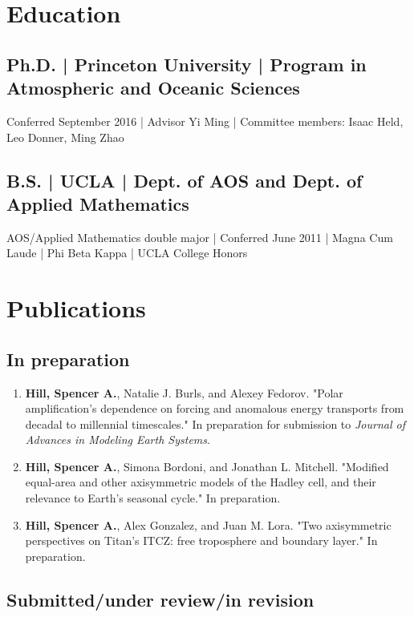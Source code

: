 \documentclass[12pt,letterpaper]{shillcv}
\begin{document}
\section*{Education}
\label{sec:orgf2144e1}
\subsection*{Ph.D. | Princeton University | Program in Atmospheric and Oceanic Sciences}
\label{sec:org8f08de2}
Conferred September 2016 | Advisor Yi Ming | Committee members: Isaac
Held, Leo Donner, Ming Zhao
\subsection*{B.S. | UCLA | Dept. of AOS and Dept. of Applied Mathematics}
\label{sec:orgc626792}
AOS/Applied Mathematics double major | Conferred June 2011 |
Magna Cum Laude | Phi Beta Kappa | UCLA College Honors
\section*{Publications}
\label{sec:org4115cb1}
\subsection*{In preparation}
\label{sec:org5477732}
\begin{enumerate}
\item \textbf{Hill, Spencer A.}, Natalie J. Burls, and Alexey Fedorov.  "Polar
amplification's dependence on forcing and anomalous energy transports from
decadal to millennial timescales."  In preparation for submission to \emph{Journal
of Advances in Modeling Earth Systems}.
\item \textbf{Hill, Spencer A.}, Simona Bordoni, and Jonathan L. Mitchell.  "Modified
equal-area and other axisymmetric models of the Hadley cell, and their
relevance to Earth's seasonal cycle."  In preparation.
\item \textbf{Hill, Spencer A.}, Alex Gonzalez, and Juan M. Lora.  "Two axisymmetric
perspectives on Titan's ITCZ: free troposphere and boundary layer."  In
preparation.
\end{enumerate}
\subsection*{Submitted/under review/in revision}
\label{sec:orge3cae81}
\end{document}
